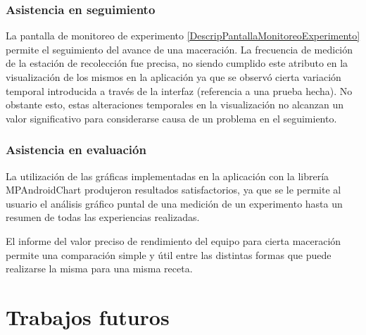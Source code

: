 
\subsubsection{Asistencia en seguimiento} 
\par La pantalla de monitoreo de experimento \ref{DescripPantallaMonitoreoExperimento} permite el seguimiento del avance de una maceración. La frecuencia de medición de la estación de recolección fue precisa, no siendo cumplido este atributo en la visualización de los mismos en la aplicación ya que se observó cierta variación temporal introducida a través de la interfaz (referencia a una prueba hecha). No obstante esto, estas alteraciones temporales en la visualización no alcanzan un valor significativo para considerarse causa de un problema en el seguimiento.


\subsubsection{Asistencia en evaluación}  
\par La utilización de las gráficas implementadas en la aplicación con la librería MPAndroidChart produjeron resultados satisfactorios, ya que se le permite al usuario el análisis gráfico puntal de una medición de un experimento hasta un resumen de todas las experiencias realizadas.
\par El informe del valor preciso de rendimiento del equipo para cierta maceración permite una comparación simple y útil entre las distintas formas que puede realizarse la misma para una misma receta. 


\section{Trabajos futuros} %

